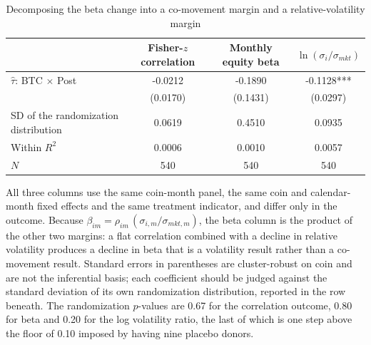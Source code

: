 \begin{table}[t]
\centering
\begin{threeparttable}
\caption{Decomposing the beta change into a co-movement margin and a relative-volatility margin}
\label{tab:decomposition}
\begin{tabular}{lccc}
\toprule
 & Fisher-$z$ correlation & Monthly equity beta & $\ln(\sigma_i/\sigma_{mkt})$ \\
\midrule
$\hat\tau$: BTC $\times$ Post & -0.0212 & -0.1890 & -0.1128*** \\
 & (0.0170) & (0.1431) & (0.0297) \\
SD of the randomization distribution & 0.0619 & 0.4510 & 0.0935 \\
Within $R^2$ & 0.0006 & 0.0010 & 0.0057 \\
$N$ & 540 & 540 & 540 \\
\bottomrule
\end{tabular}
\begin{tablenotes}[flushleft]
\footnotesize
\item All three columns use the same coin-month panel, the same coin and calendar-month fixed effects and the same treatment indicator, and differ only in the outcome. Because $\beta_{im} = \rho_{im}\,(\sigma_{i,m}/\sigma_{mkt,m})$, the beta column is the product of the other two margins: a flat correlation combined with a decline in relative volatility produces a decline in beta that is a volatility result rather than a co-movement result. Standard errors in parentheses are cluster-robust on coin and are not the inferential basis; each coefficient should be judged against the standard deviation of its own randomization distribution, reported in the row beneath. The randomization $p$-values are 0.67 for the correlation outcome, 0.80 for beta and 0.20 for the log volatility ratio, the last of which is one step above the floor of 0.10 imposed by having nine placebo donors.
\end{tablenotes}
\end{threeparttable}
\end{table}
